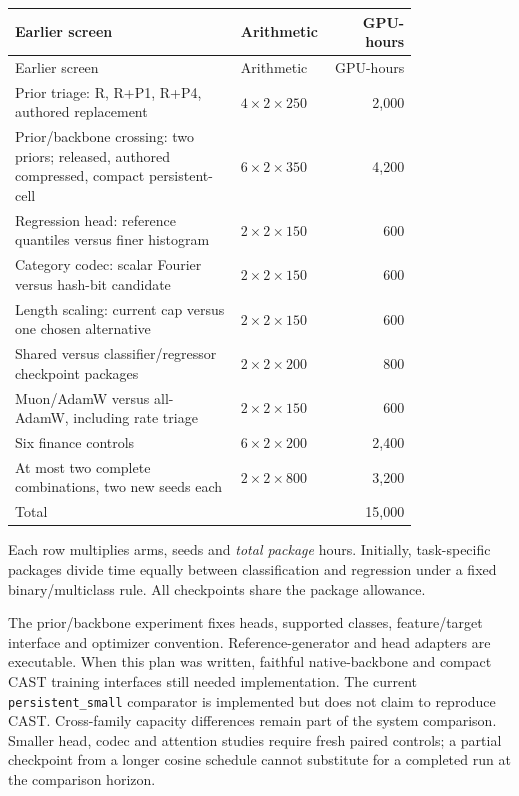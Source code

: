 \documentclass[11pt]{article}
\begin{document}
\begin{longtable}{@{}p{0.57\linewidth}p{0.23\linewidth}r@{}}
\toprule Earlier screen & Arithmetic & GPU-hours\\\midrule\endfirsthead
\toprule Earlier screen & Arithmetic & GPU-hours\\\midrule\endhead
Prior triage: R, R+P1, R+P4, authored replacement & $4\times2\times250$ & 2,000\\
Prior/backbone crossing: two priors; released, authored compressed, compact persistent-cell & $6\times2\times350$ & 4,200\\
Regression head: reference quantiles versus finer histogram & $2\times2\times150$ & 600\\
Category codec: scalar Fourier versus hash-bit candidate & $2\times2\times150$ & 600\\
Length scaling: current cap versus one chosen alternative & $2\times2\times150$ & 600\\
Shared versus classifier/regressor checkpoint packages & $2\times2\times200$ & 800\\
Muon/AdamW versus all-AdamW, including rate triage & $2\times2\times150$ & 600\\
Six finance controls & $6\times2\times200$ & 2,400\\
At most two complete combinations, two new seeds each & $2\times2\times800$ & 3,200\\
\midrule Total & & 15,000\\\bottomrule
\end{longtable}

Each row multiplies arms, seeds and \emph{total package} hours. Initially, task-specific packages divide time equally between classification and regression under a fixed binary/multiclass rule. All checkpoints share the package allowance.

The prior/backbone experiment fixes heads, supported classes, feature/target interface and optimizer convention. Reference-generator and head adapters are executable. When this plan was written, faithful native-backbone and compact CAST training interfaces still needed implementation. The current \texttt{persistent\_small} comparator is implemented but does not claim to reproduce CAST. Cross-family capacity differences remain part of the system comparison. Smaller head, codec and attention studies require fresh paired controls; a partial checkpoint from a longer cosine schedule cannot substitute for a completed run at the comparison horizon.
\end{document}
